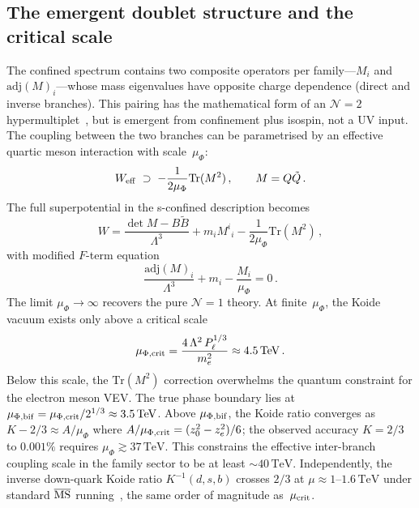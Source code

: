 \documentclass[12pt,a4paper]{article}
\newcommand{\Tr}{\mathrm{Tr}}
\newcommand{\adj}{\mathrm{adj}}
\newcommand{\TeV}{\,\mathrm{TeV}}
\begin{document}
\subsection{The emergent doublet structure and the critical scale}

The confined spectrum contains two composite operators per
family---$M_i$ and $\adj(M)_i$---whose mass eigenvalues have
opposite charge dependence (direct and inverse branches).
This pairing has the mathematical form of an $\mathcal{N}=2$
hypermultiplet~\cite{SeibergWitten:1994a,SeibergWitten:1994b},
but is emergent from confinement plus isospin, not a UV input.
The coupling between the two branches can be parametrised by
an effective quartic meson interaction with scale~$\mu_\Phi$:
\begin{equation}
  W_{\rm eff} \;\supset\; -\frac{1}{2\mu_\Phi}\Tr(M^2)\,,
  \qquad M = Q\tilde Q\,.
  \label{eq:quartic}
\end{equation}
The full superpotential in the s-confined description becomes
\begin{equation}
  W = \frac{\det M - B\tilde B}{\Lambda^3}
    + m_i M^i{}_i
    - \frac{1}{2\mu_\Phi}\Tr(M^2)\,,
  \label{eq:N2flow}
\end{equation}
with modified $F$-term equation
\begin{equation}
  \frac{\adj(M)_i}{\Lambda^3} + m_i - \frac{M_i}{\mu_\Phi} = 0\,.
  \label{eq:Fterm_mu}
\end{equation}
The limit $\mu_\Phi\to\infty$ recovers the pure $\mathcal{N}=1$ theory.
At finite~$\mu_\Phi$, the Koide vacuum exists only above a critical
scale
\begin{equation}
  \mu_{\Phi,\rm crit} = \frac{4\,\Lambda^2\,P_\ell^{1/3}}{m_e^2}
  \approx 4.5\TeV\,.
  \label{eq:mucrit}
\end{equation}
Below this scale, the $\Tr(M^2)$ correction overwhelms
the quantum constraint for the electron meson VEV.
The true phase boundary lies at
$\mu_{\Phi,\rm bif} = \mu_{\Phi,\rm crit}/2^{1/3} \approx 3.5\TeV$.
Above $\mu_{\Phi,\rm bif}$, the Koide ratio converges as
$K - 2/3 \approx A/\mu_\Phi$ where $A/\mu_{\Phi,\rm crit} = (z_0^2 - z_e^2)/6$;
the observed accuracy $K = 2/3$ to $0.001\%$ requires $\mu_\Phi \gtrsim 37\TeV$.
This constrains the effective inter-branch coupling
scale in the family sector to be at least $\sim\!40\TeV$.
Independently, the inverse down-quark Koide ratio
$K^{-1}(d,s,b)$ crosses $2/3$ at $\mu \approx 1$--$1.6\TeV$
under standard $\overline{\rm MS}$ running~\cite{AntuschHinzeSaad:2025},
the same order of magnitude as~$\mu_{\rm crit}$.
\end{document}
